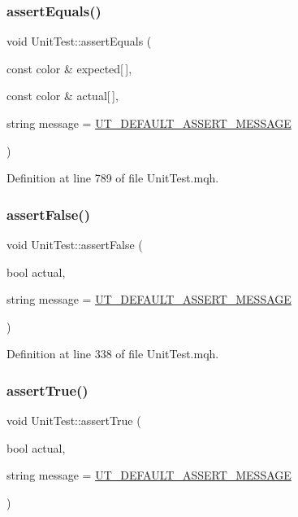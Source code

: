 \subsubsection{\texorpdfstring{assert\+Equals()}{assertEquals()}\hspace{0.1cm}{\footnotesize\ttfamily [28/28]}}
{\footnotesize\ttfamily void Unit\+Test\+::assert\+Equals (\begin{DoxyParamCaption}\item[{const color \&}]{expected\mbox{[}$\,$\mbox{]},  }\item[{const color \&}]{actual\mbox{[}$\,$\mbox{]},  }\item[{string}]{message = {\ttfamily \mbox{\hyperlink{_unit_test_8mqh_a96f5d62188d09039ebc3f443c9120e39}{U\+T\+\_\+\+D\+E\+F\+A\+U\+L\+T\+\_\+\+A\+S\+S\+E\+R\+T\+\_\+\+M\+E\+S\+S\+A\+GE}}} }\end{DoxyParamCaption})}



Definition at line 789 of file Unit\+Test.\+mqh.

\mbox{\label{class_unit_test_a97b11b635d5edd950a0a0c6d63e1fdd2}} 
\subsubsection{\texorpdfstring{assert\+False()}{assertFalse()}}
{\footnotesize\ttfamily void Unit\+Test\+::assert\+False (\begin{DoxyParamCaption}\item[{bool}]{actual,  }\item[{string}]{message = {\ttfamily \mbox{\hyperlink{_unit_test_8mqh_a96f5d62188d09039ebc3f443c9120e39}{U\+T\+\_\+\+D\+E\+F\+A\+U\+L\+T\+\_\+\+A\+S\+S\+E\+R\+T\+\_\+\+M\+E\+S\+S\+A\+GE}}} }\end{DoxyParamCaption})}



Definition at line 338 of file Unit\+Test.\+mqh.

\mbox{\label{class_unit_test_a5746fa8347d2756e0d814a08e7d1c383}} 
\subsubsection{\texorpdfstring{assert\+True()}{assertTrue()}}
{\footnotesize\ttfamily void Unit\+Test\+::assert\+True (\begin{DoxyParamCaption}\item[{bool}]{actual,  }\item[{string}]{message = {\ttfamily \mbox{\hyperlink{_unit_test_8mqh_a96f5d62188d09039ebc3f443c9120e39}{U\+T\+\_\+\+D\+E\+F\+A\+U\+L\+T\+\_\+\+A\+S\+S\+E\+R\+T\+\_\+\+M\+E\+S\+S\+A\+GE}}} }\end{DoxyParamCaption})}



